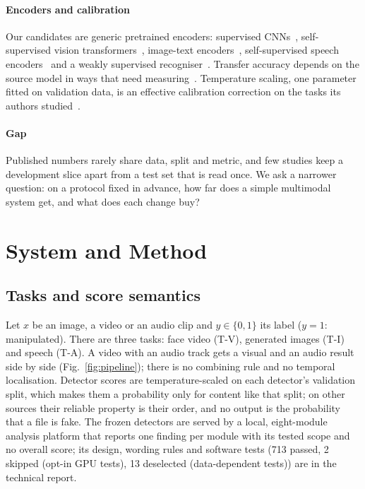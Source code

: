 \documentclass[conference,a4paper]{IEEEtran_nodash}
\begin{document}
\paragraph*{Encoders and calibration}
Our candidates are generic pretrained encoders: supervised
CNNs~\cite{chollet2017xception,tan2019efficientnet}, self-supervised vision
transformers~\cite{oquab2024dinov2}, image-text
encoders~\cite{radford2021clip,zhai2023siglip}, self-supervised speech
encoders~\cite{baevski2020wav2vec2,hsu2021hubert,chen2022wavlm} and a weakly
supervised recogniser~\cite{radford2023whisper}. Transfer accuracy depends on the
source model in ways that need measuring~\cite{kornblith2019better}. Temperature
scaling, one parameter fitted on validation data, is an effective calibration
correction on the tasks its authors studied~\cite{guo2017calibration}.

\paragraph*{Gap}
Published numbers rarely share data, split and metric, and few studies keep a
development slice apart from a test set that is read once. We ask a narrower
question: on a protocol fixed in advance, how far does a simple multimodal system
get, and what does each change buy?

\section{System and Method}\label{sec:method}

\subsection{Tasks and score semantics}
Let $x$ be an image, a video or an audio clip and $y\in\{0,1\}$ its label
($y=1$: manipulated). There are three tasks: face video (T-V), generated images
(T-I) and speech (T-A). A video with an audio track gets a visual and an audio
result side by side (Fig.~\ref{fig:pipeline}); there is no combining rule and no
temporal localisation. Detector scores are temperature-scaled on each detector's
validation split, which makes them a probability only for content like that
split; on other sources their reliable property is their order, and no output is
the probability that a file is fake. The frozen detectors are served by a local,
eight-module analysis platform that reports one finding per module with its tested
scope and no overall score; its design, wording rules and software tests (713
passed, 2 skipped (opt-in GPU tests), 13 deselected (data-dependent tests)) are in
the technical report.
\end{document}

